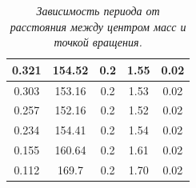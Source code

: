 \documentclass[a4paper,12pt]{report}
\begin{document}
\begin{table}[h]
{\begin{tabular}{|c|c|c|c|c|}
0.321                                                                                                                          & 154.52                                                                   & 0.2                                                                          & 1.55                                                                & 0.02                                                                                             \\ \hline
0.303                                                                                                                          & 153.16                                                                   & 0.2                                                                          & 1.53                                                                & 0.02                                                                                             \\ \hline
0.257                                                                                                                          & 152.16                                                                   & 0.2                                                                          & 1.52                                                                & 0.02                                                                                             \\ \hline
0.234                                                                                                                          & 154.41                                                                   & 0.2                                                                          & 1.54                                                                & 0.02                                                                                             \\ \hline
0.155                                                                                                                          & 160.64                                                                   & 0.2                                                                          & 1.61                                                                & 0.02                                                                                             \\ \hline
0.112                                                                                                                          & 169.7                                                                    & 0.2                                                                          & 1.70                                                                & 0.02                                                                                             \\ \hline
\end{tabular}
}
\caption{\textit{Зависимость периода от расстояния между центром масс и точкой вращения.}}
\end{table}
\end{document}
